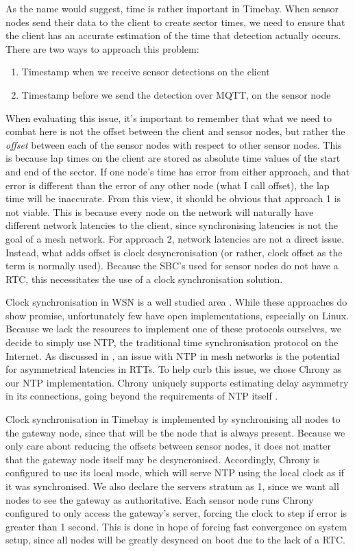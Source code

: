 \documentclass[journal]{IEEEtran}
\begin{document}
As the name would suggest, time is rather important in Timebay. When sensor nodes send their data to the client to create sector times, we need to ensure that the client has an accurate estimation of the time that detection actually occurs. There are two ways to approach this problem:
\begin{enumerate}
    \item Timestamp when we receive sensor detections on the client
    \item Timestamp before we send the detection over MQTT, on the sensor node
\end{enumerate}
When evaluating this issue, it's important to remember that what we need to combat here is not the offset between the client and sensor nodes, but rather the \textit{offset} between each of the sensor nodes with respect to other sensor nodes. This is because lap times on the client are stored as absolute time values of the start and end of the sector. If one node's time has error from either approach, and that error is different than the error of any other node (what I call offset), the lap time will be inaccurate. 
From this view, it should be obvious that approach 1 is not viable. This is because every node on the network will naturally have different network latencies to the client, since synchronising latencies is not the goal of a mesh network. For approach 2, network latencies are not a direct issue. Instead, what adds offset is clock desyncronisation (or rather, clock offset as the term is normally used). Because the SBC's used for sensor nodes do not have a RTC, this necessitates the use of a clock synchronisation solution. 

Clock synchronisation in WSN is a well studied area \cite{9297296} \cite{elson2002fine} \cite{ping2003delay} \cite{maroti2004flooding}.
While these approaches do show promise, unfortunately few have open implementations, especially on Linux. Because we lack the resources to implement one of these protocols ourselves, we decide to simply use NTP, the traditional time synchronisation protocol on the Internet. As discussed in \cite{9297296}, an issue with NTP in mesh networks is the potential for asymmetrical latencies in RTTs. To help curb this issue, we chose Chrony as our NTP implementation. Chrony uniquely supports estimating delay asymmetry in its connections, going beyond the requirements of NTP itself \cite{RFC5905}.

Clock synchronisation in Timebay is implemented by synchronising all nodes to the gateway node, since that will be the node that is always present. Because we only care about reducing the offsets between sensor nodes, it does not matter that the gateway node itself may be desyncronised. Accordingly, Chrony is configured to use its local mode, which will serve NTP using the local clock as if it was synchronised. We also declare the servers stratum as 1, since we want all nodes to see the gateway as authoritative. Each sensor node runs Chrony configured to only access the gateway's server, forcing the clock to step if error is greater than 1 second. This is done in hope of forcing fast convergence on system setup, since all nodes will be greatly desynced on boot due to the lack of a RTC. 
\end{document}
